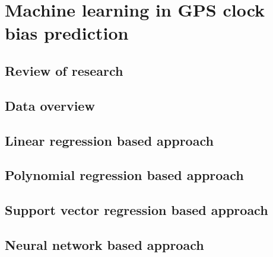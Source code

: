 \chapter{Machine learning in GPS clock bias prediction}


\section{Review of research}

\section{Data overview}

\section{Linear regression based approach}

\section{Polynomial regression based approach}

\section{Support vector regression based approach}

\section{Neural network based approach}


